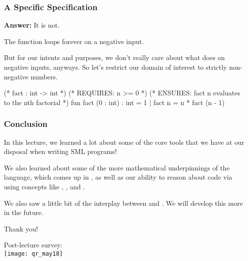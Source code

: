 \documentclass[aspectratio=169]{beamer}
\begin{document}
\begin{frame}[fragile]
  \frametitle{A Specific Specification}

  \textbf{Answer:} It is not.

  \pause
  \vspace{\fill}

  The  function loops forever on a negative input.

  \pause
  \vspace{\fill}

  But for our intents and purposes, we don't really
  care about what  does on negative inputs, anyways. So 
  let's restrict our domain of interest to strictly non-negative
  numbers.

  \pause
  \vspace{\fill}

  \begin{codeblock}
    (* fact : int -> int *)
    (* REQUIRES: n >= 0 *)
    (* ENSURES: fact n evaluates to the nth factorial *)
    fun fact (0 : int) : int = 1
      | fact n = n * fact (n - 1)
  \end{codeblock}

  \pause
\end{frame}

\begin{frame}[fragile]
  \frametitle{Conclusion}

  In this lecture, we learned a lot about some of the core
  tools that we have at our disposal when writing SML programs!

  \pause
  \vspace{\fill}

  We also learned about some of the more mathematical underpinnings
  of the language, which comes up in ,
  as well as our ability to reason about code via using concepts
  like , , and
  .

  \pause
  \vspace{\fill}

  We also saw a little bit of the interplay between 
  and . We will develop this more in the future.
\end{frame}

\begin{frame}[plain]
	\begin{center} Thank you! \end{center}

	\begin{center} 
    Post-lecture survey: \\
    \vspace{5pt}
    \texttt{[image: qr\_may18]}
  \end{center}
\end{frame}
\end{document}

